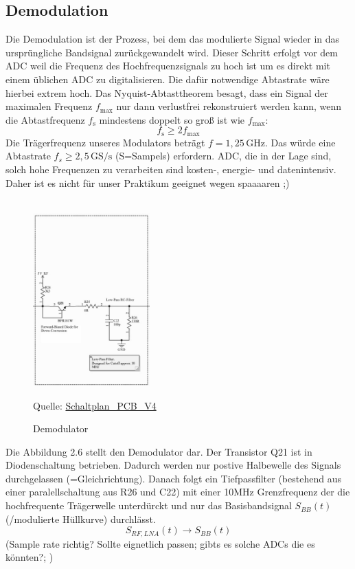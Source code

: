 \subsection{Demodulation}
Die Demodulation ist der Prozess, bei dem das modulierte Signal wieder in das ursprüngliche Bandsignal zurückgewandelt wird. Dieser Schritt erfolgt
vor dem ADC weil die Frequenz des Hochfrequenzsignals zu hoch ist um es direkt mit einem üblichen ADC zu digitalisieren. Die dafür notwendige
Abtastrate wäre hierbei extrem hoch.
Das Nyquist-Abtasttheorem besagt, dass ein Signal der maximalen Frequenz $f_\mathrm{max}$ nur dann verlustfrei rekonstruiert werden kann,
wenn die Abtastfrequenz $f_\mathrm{s}$ mindestens doppelt so groß ist wie $f_\mathrm{max}$:
\begin{equation}
    f_\mathrm{s} \geq 2 f_\mathrm{max}
\end{equation}
Die Trägerfrequenz unseres Modulators beträgt $f=1{,}25\,\mathrm{GHz}$. Das würde eine Abtastrate $f_{s} \geq 2{,}5\,\mathrm{GS/s}$ (S=Sampels) erfordern. ADC, die in der Lage sind, solch hohe Frequenzen
zu verarbeiten sind kosten-, energie- und datenintensiv. Daher ist es nicht für unser Praktikum geeignet wegen spaaaaren ;)\\
\\ 
\begin{figure}[H]
    \centering
    \includegraphics[width=0.4\textwidth]{Pictures/Demodulator.jpg}
    \caption{Demodulator}
    \footnotesize{Quelle: \url{Schaltplan_PCB_V4}}
\end{figure}



Die Abbildung 2.6 stellt den Demodulator dar. Der Transistor Q21 ist in Diodenschaltung betrieben. Dadurch werden nur postive Halbewelle des Signals 
durchgelassen (=Gleichrichtung). Danach folgt ein Tiefpassfilter (bestehend aus einer paralellschaltung aus R26 und C22) mit einer 10MHz Grenzfrequenz
der die hochfrequente Trägerwelle unterdürckt und nur das Basisbandsignal $S_{BB}(t)$ (/modulierte Hüllkurve) durchlässt.
\[
S_{RF,LNA}(t) \rightarrow S_{BB}(t)
\]
(Sample rate richtig? Sollte eignetlich passen; gibts es solche ADCs die es könnten?;  )



